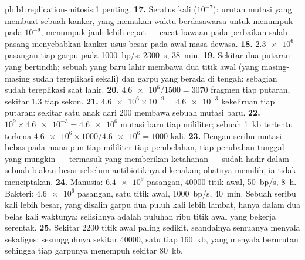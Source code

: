 \begin{solution}{pb:b1:replication-mitosis:1}
penting.
\textbf{17.} Seratus kali ($10^{-7}$): urutan mutasi yang membuat
sebuah kanker, yang memakan waktu berdasawarsa untuk menumpuk pada
$10^{-9}$, menumpuk jauh lebih cepat --- cacat bawaan pada perbaikan
salah pasang menyebabkan kanker usus besar pada awal masa dewasa.
\textbf{18.} $\num{2.3e6}$ pasangan tiap garpu pada \qty{1000}{bp/s}:
\qty{2300}{s}, \qty{38}{min}.
\textbf{19.} Sekitar dua putaran yang bertindih; sebuah  yang baru
lahir membawa dua titik awal (yang masing-masing sudah tereplikasi
sekali) dan garpu yang berada di tengah:  sebagian sudah
tereplikasi saat lahir.
\textbf{20.} $\num{4.6e6}/1500 = 3070$ fragmen tiap putaran, sekitar
1.3 tiap sekon.
\textbf{21.} $\num{4.6e6}\times 10^{-9} = \num{4.6e-3}$ kekeliruan tiap
putaran: sekitar satu  anak dari 200 membawa sebuah mutasi baru.
\textbf{22.} $10^9\times\num{4.6e-3} = \num{4.6e6}$ mutasi baru tiap
mililiter; sebuah  \qty{1}{kb} tertentu terkena $\num{4.6e6}\times
1000/\num{4.6e6} = 1000$ kali.
\textbf{23.} Dengan seribu mutasi bebas pada  mana pun tiap
mililiter tiap pembelahan, tiap perubahan tunggal yang mungkin ---
termasuk yang memberikan ketahanan --- sudah hadir dalam sebuah biakan
besar sebelum antibiotiknya dikenakan; obatnya memilih, ia tidak
menciptakan.
\textbf{24.} Manusia: $\num{6.4e9}$ pasangan, \num{40000} titik awal,
\qty{50}{bp/s}, \qty{8}{h}. Bakteri: $\num{4.6e6}$ pasangan, satu titik
awal, \qty{1000}{bp/s}, \qty{40}{min}. Sebuah  seribu kali lebih
besar, yang disalin garpu dua puluh kali lebih lambat, hanya dalam dua
belas kali waktunya: selisihnya adalah puluhan ribu titik awal yang
bekerja serentak.
\textbf{25.} Sekitar \num{2200} titik awal paling sedikit, seandainya
semuanya menyala sekaligus; sesungguhnya sekitar \num{40000}, satu tiap
\qty{160}{kb}, yang menyala berurutan sehingga tiap garpunya menempuh
sekitar \qty{80}{kb}.
\end{solution}
